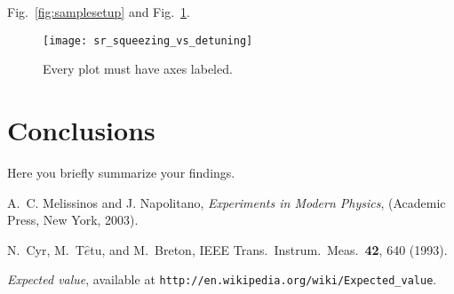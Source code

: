 \documentclass[letterpaper,12pt]{article}
\begin{document}
Fig.~\ref{fig:samplesetup} and Fig.~\ref{fig:exp_plots}.

\begin{figure}[ht] 
  \centering
      \texttt{[image: sr\_squeezing\_vs\_detuning]}

        \caption{
                \label{fig:exp_plots}  
                Every plot must have axes labeled.
        }
\end{figure}


\section{Conclusions}
Here you briefly summarize your findings.


\begin{thebibliography}{99}

A.~C. Melissinos and J. Napolitano, \textit{Experiments in Modern Physics},
(Academic Press, New York, 2003).

N.\ Cyr, M.\ T$\hat{e}$tu, and M.\ Breton,
IEEE Trans.\ Instrum.\ Meas.\ \textbf{42}, 640 (1993).

 \emph{Expected value},  available at
\texttt{http://en.wikipedia.org/wiki/Expected\_value}.

\end{thebibliography}
\end{document}
